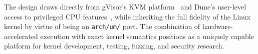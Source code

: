 \noindent
The design draws directly from gVisor's KVM platform~\cite{gvisor-platforms}
and Dune's user-level access to privileged CPU
features~\cite{belay2012}, while inheriting the full fidelity of the Linux
kernel by virtue of being an \texttt{arch/um/} port.  The combination of
hardware-accelerated execution with exact kernel semantics positions \UML{}
as a uniquely capable platform for kernel development, testing, fuzzing,
and security research.
